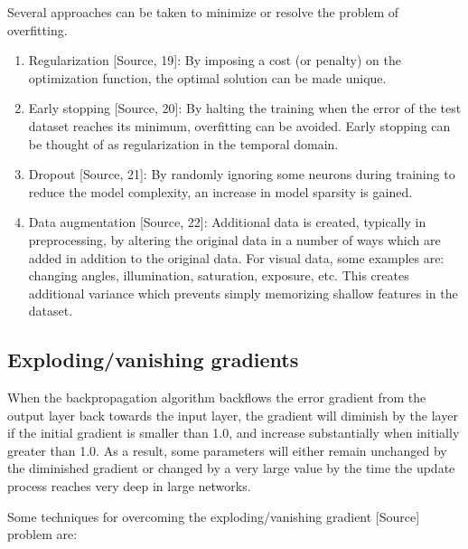 \documentclass[english, bibtex]{kththesis}
\begin{document}
Several approaches can be taken to minimize or resolve the problem of overfitting.
\begin{enumerate}
\item Regularization [Source, 19]: By imposing a cost (or penalty) on the optimization function, the optimal solution can be made unique.
\item Early stopping [Source, 20]: By halting the training when the error of the test dataset reaches its minimum, overfitting can be avoided. Early stopping can be thought of as regularization in the temporal domain. 
\item Dropout [Source, 21]: By randomly ignoring some neurons during training to reduce the model complexity, an increase in model sparsity is gained. 
\item Data augmentation [Source, 22]: Additional data is created, typically in preprocessing, by altering the original data in a number of ways which are added in addition to the original data. For visual data, some examples are: changing angles, illumination, saturation, exposure, etc. This creates additional variance which prevents simply memorizing shallow features in the dataset.
\end{enumerate}

\subsection{Exploding/vanishing gradients}
When the backpropagation algorithm backflows the error gradient from the output layer back towards the input layer, the gradient will diminish by the layer if the initial gradient is smaller than 1.0, and increase substantially when initially greater than 1.0. As a result, some parameters will either remain unchanged by the diminished gradient or changed by a very large value by the time the update process reaches very deep in large networks.

Some techniques for overcoming the exploding/vanishing gradient [Source] problem are:
\end{document}
